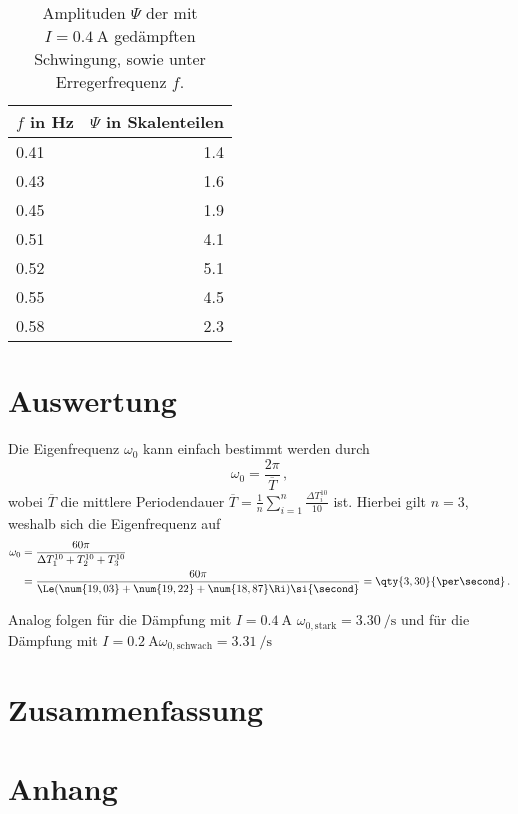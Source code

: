 \documentclass[
12pt,
a4paper,
bibliography=totocnumbered, %
BCOR=1cm, %
oneside, %
]{scrartcl}
\begin{document}
\begin{table}[H]
	\centering
	\caption{Amplituden \(\Psi\) der mit \(I = \qty{0,4}{\ampere}\) gedämpften Schwingung, sowie unter Erregerfrequenz \(f\). \label{tbl:MAXgedämpft400mA}}
	\begin{tabular}{lr}
		\toprule
		\(f\) in \si{\hertz} & \(\Psi\) in Skalenteilen\\
		\midrule
		\num{0,41} & \num{1,4}\\
		\num{0,43} & \num{1,6}\\
		\num{0,45} & \num{1,9}\\
		\num{0,51} & \num{4,1}\\
		\num{0,52} & \num{5,1}\\
		\num{0,55} & \num{4,5}\\
		\num{0,58} & \num{2,3}\\
		\bottomrule
	\end{tabular}
\end{table}

\section{Auswertung}

Die Eigenfrequenz \(\omega_0\) kann einfach bestimmt werden durch
\begin{equation*}
	\omega_0 = \frac{2\pi}{\overbar{T}} \,,
\end{equation*}
wobei \(\overbar{T}\) die mittlere Periodendauer \(\overbar{T} = \frac{1}{n} \sum_{i=1}^{n} \frac{\Delta T^{10}_i}{10}\) ist. Hierbei gilt \(n = 3\), weshalb sich die Eigenfrequenz auf
\begin{align*}
	\omega_0 &= \frac{60 \pi}{\Delta T_1^{10} + T_2^{10} + T_3^{10}}\\
			 &= \frac{60\pi}{\Le(\num{19,03} + \num{19,22} + \num{18,87}\Ri)\si{\second}} = \qty{3,30}{\per\second}\,.
\end{align*}

Analog folgen für die Dämpfung mit \(I = \qty{0,4}{\ampere}\) \(\omega_{0,\text{stark}} = \qty{3,30}{\per\second}\) und für die Dämpfung mit \(I =\qty{0,2}{\ampere}\)\(\omega_{0,\text{schwach}} = \qty{3,31}{\per\second}\)

\section{Zusammenfassung}



\printbibliography

\section{Anhang}

%
\end{document}
